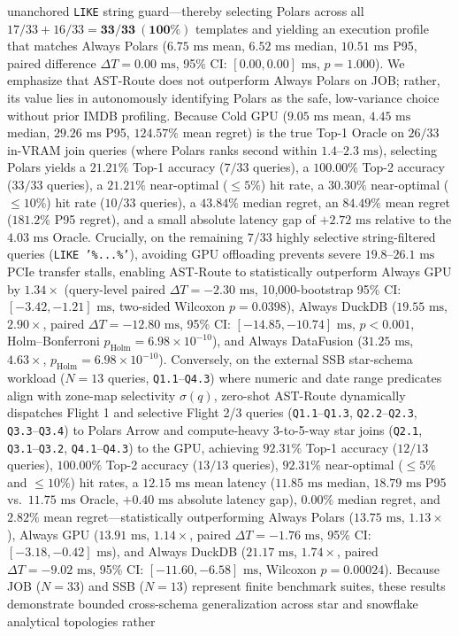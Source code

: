 \documentclass[10pt,a4paper]{article}
\begin{document}
\begin{enumerate}[leftmargin=1.5em,itemsep=0.8pt]
unanchored \texttt{LIKE} string guard---thereby selecting Polars across all $17/33 + 16/33 = \mathbf{33/33\ (100\%)}$ templates and yielding an execution profile that matches Always Polars ($6.75\text{ ms}$ mean, $6.52\text{ ms}$ median, $10.51\text{ ms}$ P95, paired difference $\Delta T = 0.00\text{ ms}$, 95\% CI: $[0.00, 0.00]\text{ ms}$, $p=1.000$). We emphasize that AST-Route does not outperform Always Polars on JOB; rather, its value lies in autonomously identifying Polars as the safe, low-variance choice without prior IMDB profiling. Because Cold GPU ($9.05\text{ ms}$ mean, $4.45\text{ ms}$ median, $29.26\text{ ms}$ P95, $124.57\%$ mean regret) is the true Top-1 Oracle on $26/33$ in-VRAM join queries (where Polars ranks second within $1.4\text{--}2.3\text{ ms}$), selecting Polars yields a $21.21\%$ Top-1 accuracy ($7/33$ queries), a $100.00\%$ Top-2 accuracy ($33/33$ queries), a $21.21\%$ near-optimal ($\le 5\%$) hit rate, a $30.30\%$ near-optimal ($\le 10\%$) hit rate ($10/33$ queries), a $43.84\%$ median regret, an $84.49\%$ mean regret ($181.2\%$ P95 regret), and a small absolute latency gap of $+2.72\text{ ms}$ relative to the $4.03\text{ ms}$ Oracle. Crucially, on the remaining $7/33$ highly selective string-filtered queries (\texttt{LIKE '\%...\%'}), avoiding GPU offloading prevents severe $19.8\text{--}26.1\text{ ms}$ PCIe transfer stalls, enabling AST-Route to statistically outperform Always GPU by $1.34\times$ (query-level paired $\Delta T = -2.30\text{ ms}$, 10,000-bootstrap 95\% CI: $[-3.42, -1.21]\text{ ms}$, two-sided Wilcoxon $p=0.0398$), Always DuckDB ($19.55\text{ ms}$, $2.90\times$, paired $\Delta T = -12.80\text{ ms}$, 95\% CI: $[-14.85, -10.74]\text{ ms}$, $p < 0.001$, Holm--Bonferroni $p_{\text{Holm}}=6.98\times 10^{-10}$), and Always DataFusion ($31.25\text{ ms}$, $4.63\times$, $p_{\text{Holm}}=6.98\times 10^{-10}$). Conversely, on the external SSB star-schema workload ($N=13$ queries, \texttt{Q1.1}--\texttt{Q4.3}) where numeric and date range predicates align with zone-map selectivity $\sigma(q)$, zero-shot AST-Route dynamically dispatches Flight 1 and selective Flight 2/3 queries (\texttt{Q1.1}--\texttt{Q1.3}, \texttt{Q2.2}--\texttt{Q2.3}, \texttt{Q3.3}--\texttt{Q3.4}) to Polars Arrow and compute-heavy 3-to-5-way star joins (\texttt{Q2.1}, \texttt{Q3.1}--\texttt{Q3.2}, \texttt{Q4.1}--\texttt{Q4.3}) to the GPU, achieving $92.31\%$ Top-1 accuracy ($12/13$ queries), $100.00\%$ Top-2 accuracy ($13/13$ queries), $92.31\%$ near-optimal ($\le 5\%$ and $\le 10\%$) hit rates, a $12.15\text{ ms}$ mean latency ($11.85\text{ ms}$ median, $18.79\text{ ms}$ P95 vs.\ $11.75\text{ ms}$ Oracle, $+0.40\text{ ms}$ absolute latency gap), $0.00\%$ median regret, and $2.82\%$ mean regret---statistically outperforming Always Polars ($13.75\text{ ms}$, $1.13\times$), Always GPU ($13.91\text{ ms}$, $1.14\times$, paired $\Delta T = -1.76\text{ ms}$, 95\% CI: $[-3.18, -0.42]\text{ ms}$), and Always DuckDB ($21.17\text{ ms}$, $1.74\times$, paired $\Delta T = -9.02\text{ ms}$, 95\% CI: $[-11.60, -6.58]\text{ ms}$, Wilcoxon $p=0.00024$). Because JOB ($N=33$) and SSB ($N=13$) represent finite benchmark suites, these results demonstrate bounded cross-schema generalization across star and snowflake analytical topologies rather 
\end{enumerate}
\end{document}
